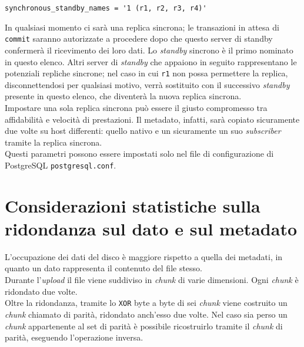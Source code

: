 \begin{center}

\verb"synchronous_standby_names = '1 (r1, r2, r3, r4)'"

\end{center}

In qualsiasi momento ci sar\`{a} una replica sincrona; le transazioni in attesa di \verb"commit" saranno autorizzate a procedere dopo che questo server di standby confermer\`{a} il ricevimento dei loro dati. 
Lo \textit{standby} sincrono \`{e} il primo nominato in questo elenco. Altri server di \textit{standby} che appaiono in seguito rappresentano le potenziali repliche sincrone; nel caso in cui \verb"r1" non possa permettere la replica, disconnettendosi per qualsiasi motivo, verr\`{a} sostituito con il successivo \textit{standby} presente in questo elenco, che diventer\`{a} la nuova replica sincrona. \\

Impostare una sola replica sincrona pu\`{o} essere il giusto compromesso tra affidabilit\`{a} e velocit\`{a} di prestazioni. Il metadato, infatti, sar\`{a} copiato sicuramente due volte su host differenti: quello nativo e un sicuramente un suo \textit{subscriber} tramite la replica sincrona.\\

Questi parametri possono essere impostati solo nel file di configurazione di PostgreSQL \verb"postgresql.conf".

\section{Considerazioni statistiche sulla ridondanza sul dato e sul metadato}
L'occupazione dei dati del disco \`{e} maggiore rispetto a quella dei metadati, in quanto un dato rappresenta il contenuto del file stesso.\\

Durante l'\textit{upload} il file viene suddiviso in \textit{chunk} di varie dimensioni. Ogni \textit{chunk} \`{e} ridondato due volte.\\
Oltre la ridondanza, tramite lo \verb"XOR" byte a byte di sei \textit{chunk} viene costruito un \textit{chunk} chiamato di parit\`{a}, ridondato anch'esso due volte. 
Nel caso sia perso un \textit{chunk} appartenente al set di parit\`{a} \`{e} possibile ricostruirlo tramite il \textit{chunk} di parit\`{a}, eseguendo l'operazione inversa.

